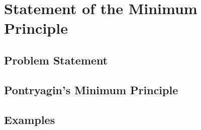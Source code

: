 \section{Statement of the Minimum Principle}

\subsection{Problem Statement}

\subsection{Pontryagin's Minimum Principle}

\subsection{Examples}